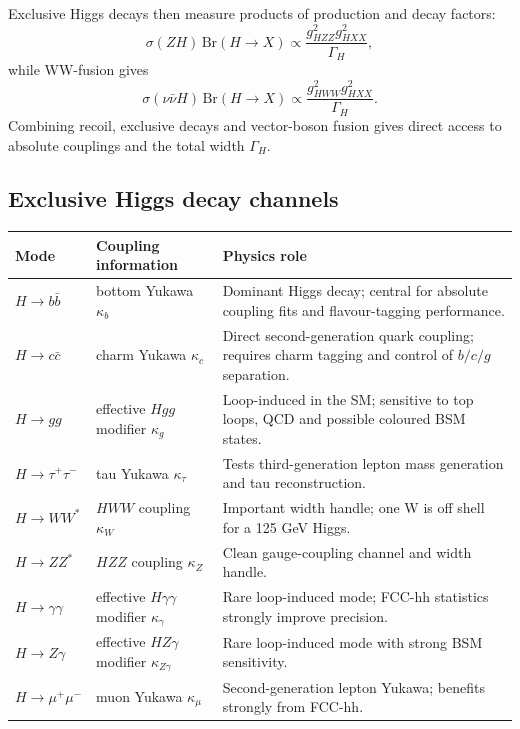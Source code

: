 \documentclass[11pt,a4paper]{report}
\newcommand{\br}{\mathrm{Br}}
\begin{document}
Exclusive Higgs decays then measure products of production and decay factors:
\begin{equation}
  \sigma(ZH)\,\br(H\to X)
  \propto \frac{g_{HZZ}^2g_{HXX}^2}{\Gamma_H},
\end{equation}
while WW-fusion gives
\begin{equation}
  \sigma(\nu\bar\nu H)\,\br(H\to X)
  \propto \frac{g_{HWW}^2g_{HXX}^2}{\Gamma_H}.
\end{equation}
Combining recoil, exclusive decays and vector-boson fusion gives direct access to absolute couplings and the total width $\Gamma_H$.

\subsection{Exclusive Higgs decay channels}

\begin{longtable}{p{}p{}p{}}
\toprule
Mode & Coupling information & Physics role \\
\midrule
$H\to b\bar b$ & bottom Yukawa $\kappa_b$ & Dominant Higgs decay; central for absolute coupling fits and flavour-tagging performance. \\
$H\to c\bar c$ & charm Yukawa $\kappa_c$ & Direct second-generation quark coupling; requires charm tagging and control of $b/c/g$ separation. \\
$H\to gg$ & effective $Hgg$ modifier $\kappa_g$ & Loop-induced in the SM; sensitive to top loops, QCD and possible coloured BSM states. \\
$H\to \tau^+\tau^-$ & tau Yukawa $\kappa_\tau$ & Tests third-generation lepton mass generation and tau reconstruction. \\
$H\to WW^*$ & $HWW$ coupling $\kappa_W$ & Important width handle; one W is off shell for a 125 GeV Higgs. \\
$H\to ZZ^*$ & $HZZ$ coupling $\kappa_Z$ & Clean gauge-coupling channel and width handle. \\
$H\to\gamma\gamma$ & effective $H\gamma\gamma$ modifier $\kappa_\gamma$ & Rare loop-induced mode; FCC-hh statistics strongly improve precision. \\
$H\to Z\gamma$ & effective $HZ\gamma$ modifier $\kappa_{Z\gamma}$ & Rare loop-induced mode with strong BSM sensitivity. \\
$H\to\mu^+\mu^-$ & muon Yukawa $\kappa_\mu$ & Second-generation lepton Yukawa; benefits strongly from FCC-hh. \\
\bottomrule
\end{longtable}
\end{document}
